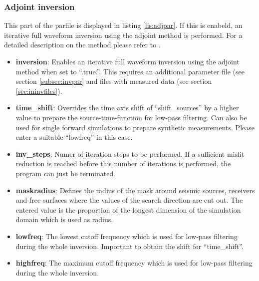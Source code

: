 		\subsubsection{Adjoint inversion}
			This part of the parfile is displayed in listing \ref{lis:adjpar}. If this is enabeld, an iterative full waveform inversion using the adjoint method is performed. For a detailed description on the method please refer to \cite{Lamert.2020}.
			
    		\begin{itemize}
    	 		\item \textbf{inversion}: Enables an iterative full waveform inversion using the adjoint method when set to ``.true.''. This requires an additional parameter file (see section \ref{subsec:invpar} and files with measured data (see section \ref{sec:ininvfiles}).
    	 		\item \textbf{time\_shift}: Overrides the time axis shift of ``shift\_sources'' by a higher value to prepare the source-time-function for low-pass filtering. Can also be used for single forward simulations to prepare synthetic measurements. Please enter a suitable ``lowfreq'' in this case.
    	 		\item \textbf{inv\_steps}: Numer of iteration steps to be performed. If a sufficient misfit reduction is reached before this number of iterations is performed, the program can just be terminated.
    	 		\item \textbf{maskradius}: Defines the radius of the mask around seismic sources, receivers and free surfaces where the values of the search direction are cut out. The entered value is the proportion of the longest dimension of the simulation domain which is used as radius.
    	 		\item \textbf{lowfreq}: The lowest cutoff frequency which is used for low-pass filtering  during the whole inversion. Important to obtain the shift for ``time\_shift''.
    	 		\item \textbf{highfreq}: The maximum cutoff frequency which is used for low-pass filtering  during the whole inversion.
    		\end{itemize}
    				 	
